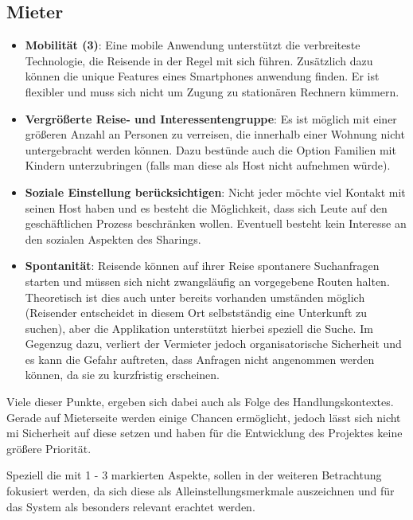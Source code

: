 \subsection{Mieter}
\begin{itemize}
   \item 
   \textbf{Mobilität (3)}: Eine mobile Anwendung unterstützt die verbreiteste Technologie, die Reisende in der Regel mit sich führen. Zusätzlich dazu können die unique Features eines Smartphones anwendung finden.
   Er ist flexibler und muss sich nicht um Zugung zu stationären Rechnern kümmern.

   \item 
   \textbf{Vergrößerte Reise- und Interessentengruppe}: Es ist möglich mit einer größeren Anzahl an Personen zu verreisen, die innerhalb einer Wohnung nicht untergebracht werden können. Dazu bestünde auch die Option Familien mit Kindern unterzubringen (falls man diese als Host nicht aufnehmen würde). 

   \item
   \textbf{Soziale Einstellung berücksichtigen}: Nicht jeder möchte viel Kontakt mit seinen Host haben und es besteht die Möglichkeit, dass sich Leute auf den geschäftlichen Prozess beschränken wollen. Eventuell besteht kein Interesse an den sozialen Aspekten des Sharings.

   \item 
   \textbf{Spontanität}: Reisende können auf ihrer Reise spontanere Suchanfragen starten und müssen sich nicht zwangsläufig an vorgegebene Routen halten. Theoretisch ist dies auch unter bereits vorhanden umständen möglich (Reisender entscheidet in diesem Ort selbstständig eine Unterkunft zu suchen), aber die Applikation unterstützt hierbei speziell die Suche. Im Gegenzug dazu, verliert der Vermieter jedoch organisatorische Sicherheit und es kann die Gefahr auftreten, dass Anfragen nicht angenommen werden können, da sie zu kurzfristig erscheinen.

\end{itemize}

Viele dieser Punkte, ergeben sich dabei auch als Folge des Handlungskontextes. Gerade auf Mieterseite werden einige Chancen ermöglicht, jedoch lässt sich nicht mi Sicherheit auf diese setzen und haben für die Entwicklung des Projektes keine größere Priorität. 

Speziell die mit 1 - 3 markierten Aspekte, sollen in der weiteren Betrachtung fokusiert werden, da sich diese als Alleinstellungsmerkmale auszeichnen und für das System als besonders relevant erachtet werden.
 
